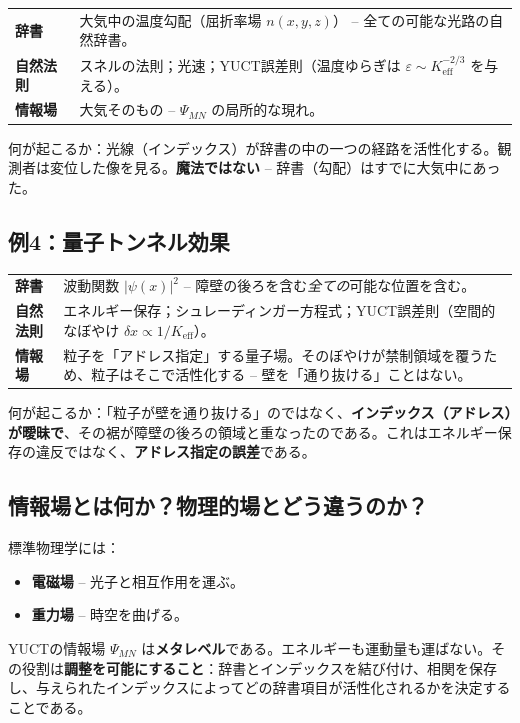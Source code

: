 \documentclass[12pt,a4paper]{article}
\begin{document}
	\begin{tabular}{p{2.8cm} p{10cm}}
		\textbf{辞書} & 大気中の温度勾配（屈折率場 \(n(x,y,z)\)） -- 全ての可能な光路の自然辞書。 \\
		\textbf{自然法則} & スネルの法則；光速；YUCT誤差則（温度ゆらぎは \(\varepsilon \sim K_{\mathrm{eff}}^{-2/3}\) を与える）。 \\
		\textbf{情報場} & 大気そのもの -- \(\Psi_{MN}\) の局所的な現れ。 \\
	\end{tabular}
	
	\noindent 何が起こるか：光線（インデックス）が辞書の中の一つの経路を活性化する。観測者は変位した像を見る。\textbf{魔法ではない} -- 辞書（勾配）はすでに大気中にあった。
	
	\subsection{例4：量子トンネル効果}
	
	\begin{tabular}{p{2.8cm} p{10cm}}
		\textbf{辞書} & 波動関数 \(|\psi(x)|^2\) -- 障壁の後ろを含む\emph{全ての}可能な位置を含む。 \\
		\textbf{自然法則} & エネルギー保存；シュレーディンガー方程式；YUCT誤差則（空間的なぼやけ \(\delta x \propto 1/K_{\mathrm{eff}}\)）。 \\
		\textbf{情報場} & 粒子を「アドレス指定」する量子場。そのぼやけが禁制領域を覆うため、粒子はそこで活性化する -- 壁を「通り抜ける」ことはない。 \\
	\end{tabular}
	
	\noindent 何が起こるか：「粒子が壁を通り抜ける」のではなく、\textbf{インデックス（アドレス）が曖昧で}、その裾が障壁の後ろの領域と重なったのである。これはエネルギー保存の違反ではなく、\textbf{アドレス指定の誤差}である。
	
	\subsection{情報場とは何か？物理的場とどう違うのか？}
	
	標準物理学には：
	\begin{itemize}
		\item \textbf{電磁場} -- 光子と相互作用を運ぶ。
		\item \textbf{重力場} -- 時空を曲げる。
	\end{itemize}
	YUCTの情報場 \(\Psi_{MN}\) は\textbf{メタレベル}である。エネルギーも運動量も運ばない。その役割は\textbf{調整を可能にすること}：辞書とインデックスを結び付け、相関を保存し、与えられたインデックスによってどの辞書項目が活性化されるかを決定することである。
	
\end{document}
